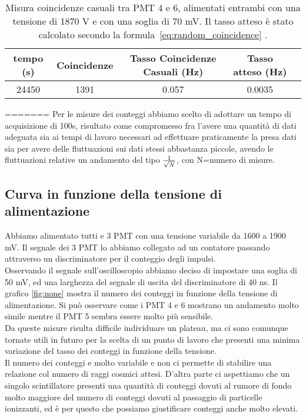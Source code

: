 \documentclass[a4paper,10pt]{article}
\begin{document}
\begin{table}
\centering
\begin{tabular}{|c|c|c|c|c|}
\hline 
tempo (s) & Coincidenze & Tasso Coincidenze Casuali (Hz) & Tasso atteso (Hz) \\ 
\hline 
24450 & 1391 & 0.057 & 0.0035\\ 
\hline 
\end{tabular} 
\caption{Misura coincidenze casuali tra PMT 4 e 6, alimentati entrambi con una tensione di 1870 V e con una soglia di 70 mV. Il tasso atteso è stato calcolato secondo la formula~\ref{eq:random_coincidence} .}
\label{tab:random_coincidence_mesured}
\end{table}
=======
Per le misure dei conteggi abbiamo scelto di adottare un tempo di acquisizione di 100s, risultato come compromesso fra l'avere una quantità di dati adeguata sia ai tempi di lavoro necessari ad effettuare praticamente la presa dati sia per avere delle fluttuazioni sui dati stessi abbastanza piccole, avendo le fluttuazioni relative un andamento del tipo $1\over{\sqrt{N}}$, con N=numero di misure.
\subsection{Curva in funzione della tensione di alimentazione}
Abbiamo alimentato tutti e 3 PMT con una tensione variabile da 1600 a 1900 mV. Il segnale dei 3 PMT lo abbiamo collegato ad un contatore passando attraverso un discriminatore per il conteggio degli impulsi.\\
Osservando il segnale sull'oscilloscopio abbiamo deciso di impostare una soglia di 50 mV, ed una larghezza del segnale di uscita del discriminatore di 40 ns. 
Il grafico \ref{fig:none} mostra il numero dei conteggi in funzione della tensione di alimentazione. Si può osservare come i PMT 4 e 6 mostrano un andamento molto simile mentre il PMT 5 sembra essere molto più sensibile.
\\
Da queste misure risulta difficile individuare un plateau, ma ci sono comunque tornate utili in futuro per la scelta di un punto di lavoro che presenti una minima variazione del tasso dei conteggi in funzione della tensione.
\\
Il numero dei conteggi e molto variabile e non ci permette di stabilire una relazione col numero di raggi cosmici attesi. D'altra parte ci aspettiamo che un singolo scintillatore presenti una quantità di conteggi dovuti al rumore di fondo molto maggiore del numero di conteggi dovuti al passaggio di particelle ionizzanti, ed è per questo che possiamo giustificare conteggi anche molto elevati.
\end{document}
